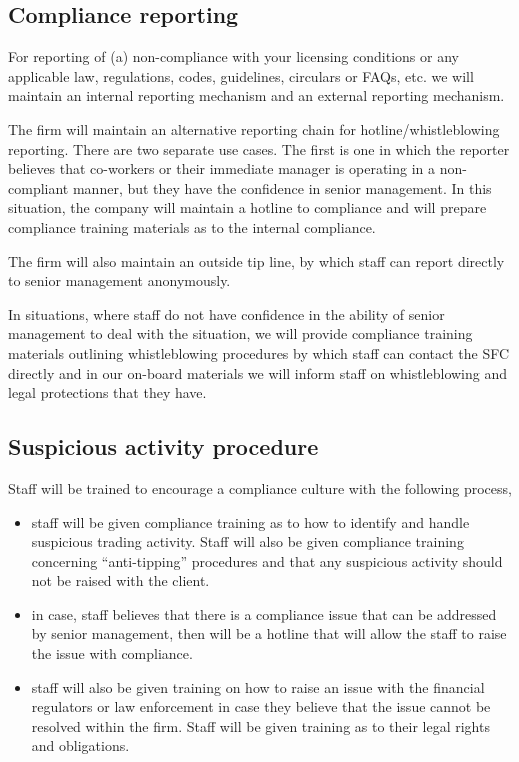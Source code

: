 \subsection{Compliance reporting}

For reporting of (a) non-compliance with your licensing conditions or
any applicable law, regulations, codes, guidelines, circulars or
FAQs, etc. we will maintain an internal reporting mechanism and an
external reporting mechanism.

The firm will maintain an alternative reporting chain for
hotline/whistleblowing reporting.  There are two separate use cases.
The first is one in which the reporter believes that co-workers or
their immediate manager is operating in a non-compliant manner, but
they have the confidence in senior management.  In this situation, the
company will maintain a hotline to compliance and will prepare
compliance training materials as to the internal compliance.

The firm will also maintain an outside tip line, by which staff can
report directly to senior management anonymously.

In situations, where staff do not have confidence in the ability of
senior management to deal with the situation, we will provide
compliance training materials outlining whistleblowing procedures by
which staff can contact the SFC directly and in our on-board materials
we will inform staff on whistleblowing and legal protections that
they have.

\subsection{Suspicious activity procedure}

Staff will be trained to encourage a compliance culture with the
following process,
\begin{itemize}
  \item staff will be given compliance training as to how to identify
    and handle suspicious trading activity.  Staff will also be given
    compliance training concerning ``anti-tipping'' procedures and
    that any suspicious activity should not be raised with the client.
  \item in case, staff believes that there is a compliance issue that
    can be addressed by senior management, then will be a hotline that
    will allow the staff to raise the issue with compliance.
  \item staff will also be given training on how to raise an issue
    with the financial regulators or law enforcement in case they
    believe that the issue cannot be resolved within the firm.  Staff
    will be given training as to their legal rights and obligations.
\end{itemize}

